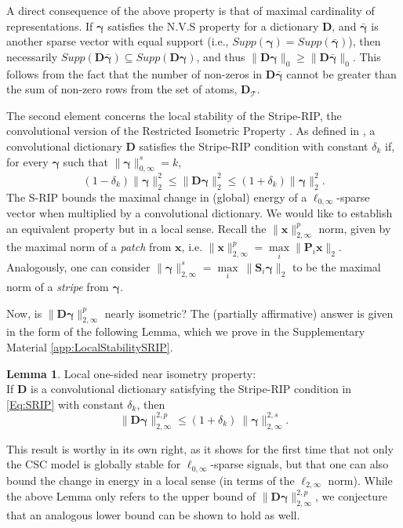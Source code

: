 \documentclass[10pt,journal]{IEEEtran}
\def\x{{\mathbf x}}
\def\D{{\mathbf D}}
\def\gama{{\boldsymbol \gamma}}
\def\Loi{{\ell_{0,\infty}}}
\theoremstyle{plain}
\theoremstyle{definition}
\newtheorem{lemma}{Lemma}
\begin{document}
A direct consequence of the above property is that of maximal cardinality of representations. If $\gama$ satisfies the N.V.S property for a dictionary $\D$, and $\bar{\gama}$ is another sparse vector with equal support (i.e., $Supp(\gama) = Supp(\bar{\gama})$), then necessarily $Supp(\D\bar{\gama}) \subseteq Supp(\D\gama)$, and thus $\|\D\gama\|_0 \geq \|\D\bar{\gama}\|_0$. This follows from the fact that the number of non-zeros in $\D\bar{\gama}$ cannot be greater than the sum of non-zero rows from the set of atoms, $\D_\mathcal{T}$. 

The second element concerns the local stability of the Stripe-RIP, the convolutional version of the Restricted Isometric Property \cite{Candes2005}. As defined in \cite{WorkingLocallyThinkingGlobally}, a convolutional dictionary $\D$ satisfies the Stripe-RIP condition with constant $\delta_k$ if, for every $\gama$ such that $\|\gama\|^s_{0,\infty}=k$,
\begin{equation} \label{Eq:SRIP}
	(1-\delta_k)\|\gama\|^2_2 \leq \|\D\gama\|^2_2 \leq (1+\delta_k)\|\gama\|^2_2.
\end{equation}
The S-RIP bounds the maximal change in (global) energy of a $\Loi$-sparse vector when multiplied by a convolutional dictionary. We would like to establish an equivalent property but in a local sense. Recall the $\|\x\|^p_{2,\infty}$ norm, given by the maximal norm of a \emph{patch} from $\x$, i.e. $\|\x\|^p_{2,\infty} = \underset{i}{\max} \|\mathbf{P}_i\x\|_2$. Analogously, one can consider $\|\gama\|^s_{2,\infty} = \underset{i}{\max}\ \|\mathbf{S}_i\gama\|_2$ to be the maximal norm of a \emph{stripe} from $\gama$.

Now, is $\|\D\gama\|^{p}_{2,\infty}$ nearly isometric? The (partially affirmative) answer is given in the form of the following Lemma, which we prove in the Supplementary Material \ref{app:LocalStabilitySRIP}.

\begin{lemma}{Local one-sided near isometry property:} \label{lemma:LocalSRIP} \\
If $\D$ is a convolutional dictionary satisfying the Stripe-RIP condition in \eqref{Eq:SRIP} with constant $\delta_k$, then
\begin{equation}
	\|\D\gama\|^{2,p}_{2,\infty} \leq (1+\delta_k)\ \|\gama\|^{2,s}_{2,\infty}.
\end{equation}
\end{lemma}

This result is worthy in its own right, as it shows for the first time that not only the CSC model is globally stable for $\Loi$-sparse signals, but that one can also bound the change in energy in a local sense (in terms of the $\ell_{2,\infty}$ norm). %
While the above Lemma only refers to the upper bound of $\|\D\gama\|^{2,p}_{2,\infty}$, we conjecture that an analogous lower bound can be shown to hold as well. %
\end{document}
